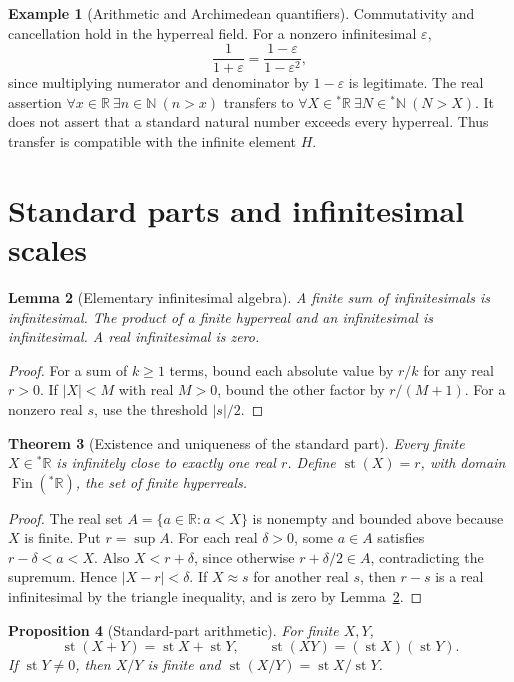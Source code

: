 \documentclass[11pt]{article}
\newtheorem{theorem}{Theorem}[section]
\newtheorem{proposition}[theorem]{Proposition}
\newtheorem{lemma}[theorem]{Lemma}
\theoremstyle{definition}
\newtheorem{example}[theorem]{Example}
\theoremstyle{remark}
\newcommand{\RR}{\mathbb R}
\newcommand{\NN}{\mathbb N}
\newcommand{\HR}{{}^{*}\mathbb R}
\newcommand{\ext}[1]{{}^{*}\!#1}
\DeclareMathOperator{\st}{st}
\DeclareMathOperator{\Fin}{Fin}
\begin{document}
\begin{example}[Arithmetic and Archimedean quantifiers]\label{ex:transfer}
Commutativity and cancellation hold in the hyperreal field. For a nonzero
infinitesimal \(\varepsilon\),
\[
\frac1{1+\varepsilon}=\frac{1-\varepsilon}{1-\varepsilon^2},
\]
since multiplying numerator and denominator by \(1-\varepsilon\) is legitimate.
The real assertion \(\forall x\in\RR\ \exists n\in\NN\ (n>x)\) transfers to
\(\forall X\in\HR\ \exists N\in\ext\NN\ (N>X)\).
It does not assert that a standard natural number exceeds every hyperreal.
Thus transfer is compatible with the infinite element \(H\).
\end{example}

\section{Standard parts and infinitesimal scales}\label{sec:scales}
\begin{lemma}[Elementary infinitesimal algebra]\label{lem:algebra}
A finite sum of infinitesimals is infinitesimal. The product of a finite
hyperreal and an infinitesimal is infinitesimal. A real infinitesimal is zero.
\end{lemma}
\begin{proof}
For a sum of \(k\ge1\) terms, bound each absolute value by \(r/k\) for any
real \(r>0\). If \(|X|<M\) with real \(M>0\), bound the other factor by
\(r/(M+1)\). For a nonzero real \(s\), use the threshold \(|s|/2\).
\end{proof}
\begin{theorem}[Existence and uniqueness of the standard part]\label{thm:st}
Every finite \(X\in\HR\) is infinitely close to exactly one real \(r\).
Define \(\st(X)=r\), with domain \(\Fin(\HR)\), the set of finite hyperreals.
\end{theorem}
\begin{proof}
The real set \(A=\{a\in\RR:a<X\}\) is nonempty and bounded above because
\(X\) is finite. Put \(r=\sup A\). For each real \(\delta>0\), some
\(a\in A\) satisfies \(r-\delta<a<X\). Also \(X<r+\delta\), since otherwise
\(r+\delta/2\in A\), contradicting the supremum. Hence \(|X-r|<\delta\).
If \(X\approx s\) for another real \(s\), then \(r-s\) is a real infinitesimal
by the triangle inequality, and is zero by Lemma~\ref{lem:algebra}.
\end{proof}
\begin{proposition}[Standard-part arithmetic]\label{prop:st-arithmetic}
For finite \(X,Y\),
\[
\st(X+Y)=\st X+\st Y,\qquad \st(XY)=(\st X)(\st Y).
\]
If \(\st Y\ne0\), then \(X/Y\) is finite and
\(\st(X/Y)=\st X/\st Y\).
\end{proposition}
\end{document}

